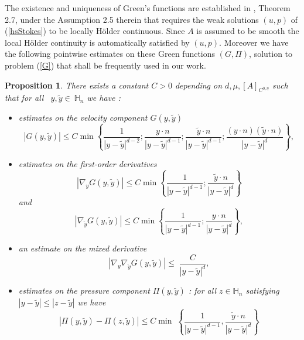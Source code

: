 \documentclass[11pt, reqno]{amsart}
\newtheorem{proposition}[theorem]{Proposition}
\theoremstyle{definition}
\theoremstyle{remark}
\numberwithin{equation}{section}
\begin{document}
	
	\noindent  The existence 	and uniqueness of Green's functions are established in \cite{choi}, Theorem 2.7,  under the Assumption 2.5 therein that requires  the weak solutions $(u,p)$ of (\ref{hsStokes}) to be locally H\"older continuous. Since  $A$ is assumed to be smooth the local H\"older continuity is automatically satisfied by $(u,p)$. 
	Moreover we have the following pointwise estimates on these Green functions $(G,\Pi)$, solution to problem (\ref{G}) that shall be frequently used in our work.
	
	\begin{proposition}\label{Propo_estim_Green_y}
		There exists a constant $C>0$ depending on $d,\mu, [A]_{C^{0,\eta}}$  such that for all~ $y,\tilde{y} \in~\mathbb{H}_n$ we have : 
		\begin{itemize}
			\item 	estimates on the velocity component $G(y,\tilde{y})$
			\begin{equation}\label{estim_G_y}
				| G(y,\tilde{y})| \leq C \min \left\{  \frac{1 }{|y-\tilde{y}|^{d-2}};	\frac{y\cdot n}{|y-\tilde{y}|^{d-1}}; 
				\frac{\tilde{y}\cdot n }{|y-\tilde{y}|^{d-1}}; \frac{(y\cdot n)(\tilde{y}\cdot n) }{|y-\tilde{y}|^d}  \right\}\!,
			\end{equation}
		\item 	estimates  on the first-order derivatives 
			\begin{equation}\label{estim_Dy_G}
				|\nabla_y G(y,\tilde{y})| \leq  C \min \left\{  \frac{1 }{|y-\tilde{y}|^{d-1}}; 
				\frac{\tilde{y}\cdot n }{|y-\tilde{y}|^{d}}  \right\}
			\end{equation}		
			and
			\begin{equation}\label{estim_dertildG}
				|\nabla_{\tilde{y}} G(y,\tilde{y})| \leq  C \min \left\{  \frac{1 }{|y-\tilde{y}|^{d-1}}; 
				\frac{y\cdot n }{|y-\tilde{y}|^{d}}\right\}\!,
			\end{equation}
		\item 	an estimate on the mixed derivative
			\begin{equation}\label{estim_mixder}
				| \nabla_y\!\nabla_{\tilde{y}} G(y,\tilde{y})| \leq  \; \frac{C }{|y-\tilde{y}|^d} ,
			\end{equation}
		\item	estimates  on the pressure component $\Pi(y,\tilde{y}) $ :   for all $z\in \mathbb{H}_n$ satisfying $|y-\tilde{y}|\leq |z-\tilde{y}|$ we have
			\begin{equation}\label{estim_diff_Pi_y}
				| \Pi(y,\tilde{y}) -  \Pi(z,\tilde{y})| \leq C \min \;\left\{\frac{1 }{|y-\tilde{y}|^{d-1}}  ,\frac{\tilde{y}\cdot n }{|y-\tilde{y}|^{d}} \right\} 

\end{equation}
\end{itemize}
\end{proposition}
\end{document}
